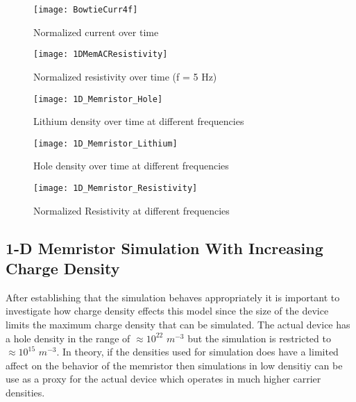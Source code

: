 \begin{doublespace}
\begin{figure}[!htp]
\centering
\texttt{[image: BowtieCurr4f]}
\caption{Normalized current over time} 
\label{BowtieCurr}
\end{figure}


\begin{landscape}
\begin{figure}[!htp]
\centering
\texttt{[image: 1DMemACResistivity]}
\caption{Normalized resistivity over time (f = 5 Hz)} 
\label{BowtieRes}
\end{figure}
\end{landscape} 

\begin{landscape}
\begin{figure}[!htp]
\centering
\texttt{[image: 1D\_Memristor\_Hole]}
\caption{Lithium density over time at different frequencies} 
\label{}
\end{figure}
\end{landscape} 

\begin{landscape}
\begin{figure}[!htp]
\centering
\texttt{[image: 1D\_Memristor\_Lithium]}
\caption{Hole density over time at different frequencies} 
\label{}
\end{figure}
\end{landscape} 

\begin{landscape}
\begin{figure}[!htp]
\centering
\texttt{[image: 1D\_Memristor\_Resistivity]}
\caption{Normalized Resistivity at different frequencies} 
\label{}
\end{figure}
\end{landscape} 

\clearpage
\subsection{1-D Memristor Simulation With Increasing Charge Density}

After establishing that the simulation behaves appropriately it is important to investigate how charge density effects this model since the size of the device limits the maximum charge density that can be simulated. The actual device has a hole density in the range of $ \approx 10^{22}$ $m^{-3}$ but the simulation is restricted to $\approx 10^{15}$ $m^{-3}$. In theory, if the densities used for simulation does have a limited affect on the behavior of the memristor then simulations in low densitiy can be use as a proxy for the actual device which operates in much higher carrier densities.


\end{doublespace}
